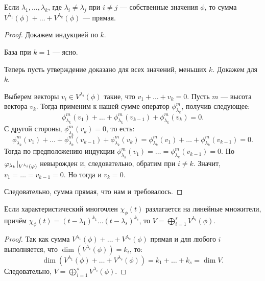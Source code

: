 \begin{Suggestion}
	Если $\lambda_1, \ldots, \lambda_k$, где $\lambda_i \neq \lambda_j$ при $i \neq j$ --- собственные значения $\phi$, то сумма $V^{\lambda_1}(\phi) + \ldots + V^{\lambda_k}(\phi)$ --- прямая.
\end{Suggestion}

\begin{proof}
	Докажем индукцией по $k$.
	
	База при $k = 1$ --- ясно.
	
	Теперь пусть утверждение доказано для всех значений, меньших $k$. Докажем для $k$.
	
	Выберем векторы $v_i \in V^{\lambda_i}(\phi)$ такие, что $v_1 + \ldots + v_k = 0$. Пусть $m$ --- высота вектора $v_k$. Тогда применим к нашей сумме оператор $\phi^m_{\lambda_k}$, получив следующее:
	\[
	\phi^m_{\lambda_k}(v_1) + \ldots + \phi^m_{\lambda_k}(v_{k-1}) + \phi^m_{\lambda_k}(v_k) = 0.
	\]
	С другой стороны, $ \phi^m_{\lambda_k}(v_k) = 0$, то есть:
	\[
	\phi^m_{\lambda_k}(v_1) + \ldots + \phi^m_{\lambda_k}(v_{k-1}) + \phi^m_{\lambda_k}(v_k) = \phi^m_{\lambda_k}(v_1) + \ldots + \phi^m_{\lambda_k}(v_{k-1}) = 0.
	\]
	Тогда по предположению индукции $\phi^m_{\lambda_k}(v_1) = \ldots = \phi^m_{\lambda_k}(v_{k-1}) = 0$. Hо
	$ {\varphi_{\lambda_k}}\negmedspace\mid_{V^{\lambda_i}(\varphi)}$ невырожден и, следовательно, обратим при $i \neq k$. Значит, $v_1 = \ldots = v_{k-1} = 0$. Но тогда и $v_k = 0$. 
	
	Следовательно, сумма прямая, что нам и требовалось.
\end{proof}

\begin{Theorem}
	Если характеристический многочлен $\chi_\phi(t)$ разлагается на линейные множители, причём $\chi_\phi(t) = (t - \lambda_1)^{k_1}\ldots(t - \lambda_s)^{k_s}$, то $V = \bigoplus_{i = 1}^s  V^{\lambda_i}(\phi)$.
\end{Theorem}

\begin{proof}
	Так как сумма $ V^{\lambda_1}(\phi) + \ldots +  V^{\lambda_s}(\phi)$ прямая и для любого $i$ выполняется, что $\dim(V^{\lambda_i}(\phi)) = k_i$, то: 
	$$
	\dim(V^{\lambda_1}(\phi) + \ldots +  V^{\lambda_s}(\phi)) = k_1 + \ldots + k_s = \dim{V}.
	$$
	Следовательно, $V = \bigoplus_{i = 1}^s  V^{\lambda_i}(\phi)$.
\end{proof}

